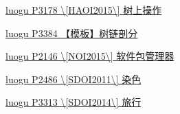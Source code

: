 \href{https://www.luogu.org/problemnew/show/P3178}{luogu P3178 \textbackslash{}[HAOI2015\textbackslash{}] 树上操作}

\href{https://www.luogu.org/problemnew/show/P3384}{luogu P3384 【模板】树链剖分}

\href{https://www.luogu.org/problemnew/show/P2146}{luogu P2146 \textbackslash{}[NOI2015\textbackslash{}] 软件包管理器}

\href{https://www.luogu.org/problemnew/show/P2486}{luogu P2486 \textbackslash{}[SDOI2011\textbackslash{}] 染色}

\href{https://www.luogu.org/problemnew/show/P3313}{luogu P3313 \textbackslash{}[SDOI2014\textbackslash{}] 旅行}
